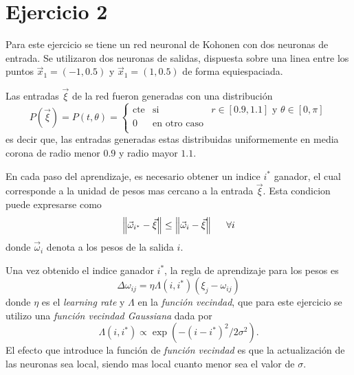 \section*{Ejercicio 2}
\graphicspath{{/home/cabre/Desktop/Redes_Neuronales/Redes_Neuronales_IB/Practica_5/Figuras/}}

Para este ejercicio se tiene un red neuronal de Kohonen con dos neuronas de entrada. Se utilizaron dos neuronas de salidas, dispuesta sobre una linea entre los puntos $\vec{x}_1 = \left( -1,0.5 \right)$ y $\vec{x}_1 = \left( 1,0.5 \right)$ de forma equiespaciada.

Las entradas $\vec{\xi}$ de la red fueron generadas con una distribución
\begin{equation}
    P\left(\vec{\xi}\right) = P\left(t, \theta\right) =
    \left\{ \begin{array}{lcc}
        \text{cte}  & \text{si} & r \in \left[0.9, 1.1\right] \,\,\text{y}\,\, \theta \in \left[0, \pi\right] \\
        0           & \text{en otro caso} \\
        \end{array}
    \right.
\end{equation}
es decir que, las entradas generadas estas distribuidas uniformemente en media corona de radio menor $0.9$ y radio mayor $1.1$.

En cada paso del aprendizaje, es necesario obtener un indice $i^{*}$ ganador, el cual corresponde a la unidad de pesos mas cercano a la entrada $\vec{\xi}$. Esta condicion puede expresarse como
\begin{equation}
    \left\| \vec{\omega}_{i^{*}} - \vec{\xi} \right\| \leq \left\| \vec{\omega}_{i} - \vec{\xi} \right\| \hspace{0.5cm} \forall i 
\end{equation}
donde $\vec{\omega}_{i}$ denota a los pesos de la salida $i$.

Una vez obtenido el indice ganador $i^{*}$, la regla de aprendizaje para los pesos es
\begin{equation}
    \Delta \omega_{ij} = \eta \Lambda \left( i, i^{*} \right) \left( \xi_{j} - \omega_{ij} \right)
\end{equation}
donde $\eta$ es el \textit{learning rate} y $\Lambda$ en la \textit{función vecindad}, que para este ejercicio se utilizo una \textit{función vecindad Gaussiana} dada por
\begin{equation}
    \Lambda \left(i, i^{*}\right) \propto \exp \left( - \left( i-i^{*} \right)^{2} / 2\sigma^{2} \right).
\end{equation}
El efecto que introduce la función de \textit{función vecindad} es que la actualización de las neuronas sea local, siendo mas local cuanto menor sea el valor de $\sigma$.


